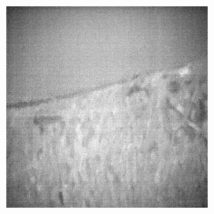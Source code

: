 \documentclass[10pt,twocolumn,letterpaper]{article}
\begin{document}
\begin{figure}[!ht]
\begin{subfigure}[b]{0.19\textwidth}
  \end{subfigure}
  \hfill
  \begin{subfigure}[b]{0.19\textwidth}
      \centering
      \includegraphics[width=\textwidth]{../figs/outputs/mono/399.png}
  \end{subfigure}    
  

\end{figure}
\end{document}
